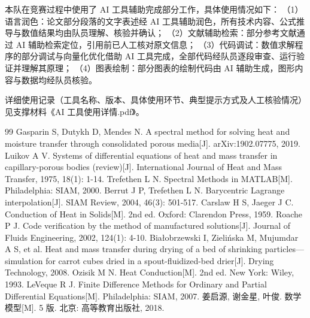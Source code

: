 \documentclass{cumcmthesis}
\begin{document}
本队在竞赛过程中使用了 AI 工具辅助完成部分工作，具体使用情况如下：
（1）语言润色：论文部分段落的文字表述经 AI 工具辅助润色，所有技术内容、公式推导与数值结果均由队员理解、核验并确认；
（2）文献辅助检索：部分参考文献通过 AI 辅助检索定位，引用前已人工核对原文信息；
（3）代码调试：数值求解程序的部分调试与向量化优化借助 AI 工具完成，全部代码经队员逐段审查、运行验证并理解其原理；
（4）图表绘制：部分图表的绘制代码由 AI 辅助生成，图形内容与数据均经队员核验。

详细使用记录（工具名称、版本、具体使用环节、典型提示方式及人工核验情况）见支撑材料《AI 工具使用详情.pdf》。

\begin{thebibliography}{99}
 Gasparin S, Dutykh D, Mendes N. A spectral method for solving heat and moisture transfer through consolidated porous media[J]. arXiv:1902.07775, 2019.
 Luikov A V. Systems of differential equations of heat and mass transfer in capillary-porous bodies (review)[J]. International Journal of Heat and Mass Transfer, 1975, 18(1): 1-14.
 Trefethen L N. Spectral Methods in MATLAB[M]. Philadelphia: SIAM, 2000.
 Berrut J P, Trefethen L N. Barycentric Lagrange interpolation[J]. SIAM Review, 2004, 46(3): 501-517.
 Carslaw H S, Jaeger J C. Conduction of Heat in Solids[M]. 2nd ed. Oxford: Clarendon Press, 1959.
 Roache P J. Code verification by the method of manufactured solutions[J]. Journal of Fluids Engineering, 2002, 124(1): 4-10.
 Bia\l{}obrzewski I, Zieli\'nska M, Mujumdar A S, et al. Heat and mass transfer during drying of a bed of shrinking particles---simulation for carrot cubes dried in a spout-fluidized-bed drier[J]. Drying Technology, 2008.
 Ozisik M N. Heat Conduction[M]. 2nd ed. New York: Wiley, 1993.
 LeVeque R J. Finite Difference Methods for Ordinary and Partial Differential Equations[M]. Philadelphia: SIAM, 2007.
 姜启源, 谢金星, 叶俊. 数学模型[M]. 5 版. 北京: 高等教育出版社, 2018.
\end{thebibliography}

\newpage
\appendix

\end{document}
